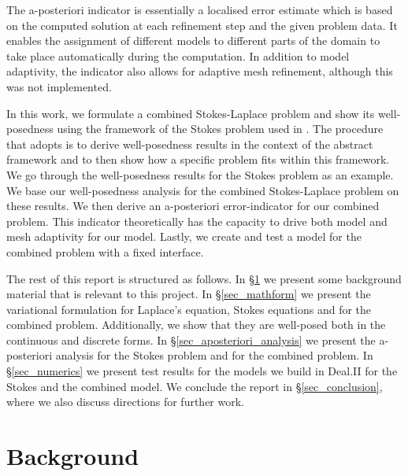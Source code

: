 \documentclass[12pt,a4paper]{article}
\theoremstyle{definition}
\begin{document}
The a-posteriori indicator is essentially a localised error estimate which is based on the computed solution at each refinement step and the given problem data. It enables the assignment of different models to different parts of the domain to take place automatically during the computation.  In addition to model adaptivity, the indicator also allows for adaptive mesh refinement, although this was not implemented.  

In this work, we formulate a combined Stokes-Laplace problem and show its well-posedness using the framework of the Stokes problem used in \cite{verfurth2013posteriori}.  The procedure that \cite{verfurth2013posteriori} adopts is to derive well-posedness results in the context of the abstract framework and to then show how a specific problem fits within this framework.  We go through the well-posedness results for the Stokes problem as an example.  We  base our well-posedness analysis for the combined Stokes-Laplace problem on these results.  We then derive an a-posteriori error-indicator for our combined problem.   This indicator theoretically has the capacity to drive both model and mesh adaptivity for our model.  Lastly, we create and test a model for the combined problem with a fixed interface.


The rest of this report is structured as follows.  In \S \ref{literature_review} we present some background material that is relevant to this project. In \S \ref{sec_mathform} we present the variational formulation for Laplace's equation, Stokes equations and for the combined problem.  Additionally, we show that they are well-posed both in the continuous and discrete forms.  In \S \ref{sec_aposteriori_analysis} we  present the a-posteriori analysis for the Stokes problem and for the combined problem. In \S \ref{sec_numerics} we present test results for the models we build in Deal.II for the Stokes and the combined model.   We conclude the report in \S \ref{sec_conclusion}, where we also discuss directions for further work.

\section{Background}\label{literature_review}
\end{document}
